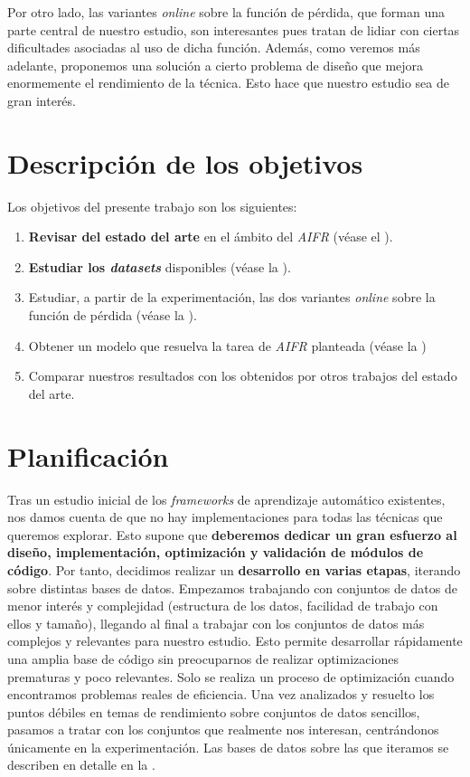 Por otro lado, las variantes \textit{online} sobre la función de pérdida, que forman una parte central de nuestro estudio, son interesantes pues tratan de lidiar con ciertas dificultades asociadas al uso de dicha función. Además, como veremos más adelante, proponemos una solución a cierto problema de diseño que mejora enormemente el rendimiento de la técnica. Esto hace que nuestro estudio sea de gran interés.

\section{Descripción de los objetivos}

Los objetivos del presente trabajo son los siguientes:

\begin{enumerate}
	\item \textbf{Revisar del estado del arte} en el ámbito del \textit{AIFR} (véase el ).
	\item \textbf{Estudiar los \textit{datasets}} disponibles (véase la ).
	\item Estudiar, a partir de la experimentación, las dos variantes \textit{online} sobre la función de pérdida (véase la ).
	\item Obtener un modelo que resuelva la tarea de \textit{AIFR} planteada (véase la )
	\item Comparar nuestros resultados con los obtenidos por otros trabajos del estado del arte.
\end{enumerate}

\section{Planificación} \label{isec:planificacion}

Tras un estudio inicial de los \textit{frameworks} de aprendizaje automático existentes, nos damos cuenta de que no hay implementaciones para todas las técnicas que queremos explorar. Esto supone que \textbf{deberemos dedicar un gran esfuerzo al diseño, implementación, optimización y validación de módulos de código}. Por tanto, decidimos realizar un \textbf{desarrollo en varias etapas}, iterando sobre distintas bases de datos. Empezamos trabajando con conjuntos de datos de menor interés y complejidad (estructura de los datos, facilidad de trabajo con ellos y tamaño), llegando al final a trabajar con los conjuntos de datos más complejos y relevantes para nuestro estudio. Esto permite desarrollar rápidamente una amplia base de código sin preocuparnos de realizar optimizaciones prematuras y poco relevantes. Solo se realiza un proceso de optimización cuando encontramos problemas reales de eficiencia. Una vez analizados y resuelto los puntos débiles en temas de rendimiento sobre conjuntos de datos sencillos, pasamos a tratar con los conjuntos que realmente nos interesan, centrándonos únicamente en la experimentación. Las bases de datos sobre las que iteramos se describen en detalle en la .

